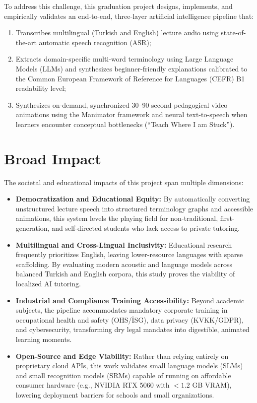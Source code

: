 \documentclass[a4paper,12pt]{report}
\begin{document}
To address this challenge, this graduation project designs, implements, and empirically validates an end-to-end, three-layer artificial intelligence pipeline that:
\begin{enumerate}
    \item Transcribes multilingual (Turkish and English) lecture audio using state-of-the-art automatic speech recognition (ASR);
    \item Extracts domain-specific multi-word terminology using Large Language Models (LLMs) and synthesizes beginner-friendly explanations calibrated to the Common European Framework of Reference for Languages (CEFR) B1 readability level;
    \item Synthesizes on-demand, synchronized 30--90 second pedagogical video animations using the Manimator framework and neural text-to-speech when learners encounter conceptual bottlenecks (``Teach Where I am Stuck'').
\end{enumerate}

\section{Broad Impact}
The societal and educational impacts of this project span multiple dimensions:
\begin{itemize}
    \item \textbf{Democratization and Educational Equity:} By automatically converting unstructured lecture speech into structured terminology graphs and accessible animations, this system levels the playing field for non-traditional, first-generation, and self-directed students who lack access to private tutoring.
    \item \textbf{Multilingual and Cross-Lingual Inclusivity:} Educational research frequently prioritizes English, leaving lower-resource languages with sparse scaffolding. By evaluating modern acoustic and language models across balanced Turkish and English corpora, this study proves the viability of localized AI tutoring.
    \item \textbf{Industrial and Compliance Training Accessibility:} Beyond academic subjects, the pipeline accommodates mandatory corporate training in occupational health and safety (OHS/İSG), data privacy (KVKK/GDPR), and cybersecurity, transforming dry legal mandates into digestible, animated learning moments.
    \item \textbf{Open-Source and Edge Viability:} Rather than relying entirely on proprietary cloud APIs, this work validates small language models (SLMs) and small recognition models (SRMs) capable of running on affordable consumer hardware (e.g., NVIDIA RTX 5060 with $<1.2$ GB VRAM), lowering deployment barriers for schools and small organizations.
\end{itemize}
\end{document}
